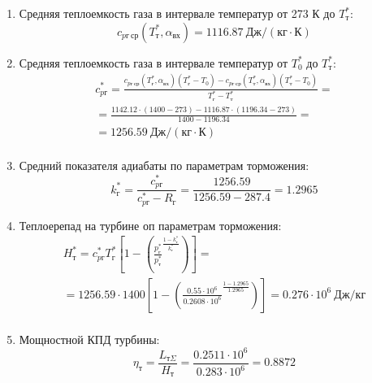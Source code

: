 \documentclass[a4paper,10pt]{article}
\begin{document}
\begin{enumerate}
        \item Средняя теплоемкость газа в интервале температур от 273 К до $T_т^*$:
        \[
            c_{pг\ ср} (T_т^*, \alpha_{вх}) =
            1116.87 \ Дж/(кг \cdot К)
        \]

        \item Средняя теплоемкость газа в интервале температур от $T_0^*$ до $T_т^*$:
        \begin{gather*}
            c_{pг}^* = \frac{
		         c_{pг\ ср} (T_г^*, \alpha_{вх}) (T_г^* - T_0) - c_{pг\ ср} (T_т^*, \alpha_{вх})(T_т^* - T_0)
		    }{
		        T_г^* - T_т^*} =\\
            =\frac{
                1142.12 \cdot
                (1400 - 273) -
		        1116.87 \cdot
                (1196.34 - 273)
		    }{
		        1400 - 1196.34} =\\
		     = 1256.59 \ Дж / (кг \cdot К)\\
        \end{gather*}

        \item Средний показателя адиабаты по параметрам торможения:
        \[
            k_г^* = \frac{ c_{pг}^* }{ c_{pг}^* - R_г } =
                \frac{
                    1256.59
                }{
                    1256.59 - 287.4
                }
            = 1.2965
        \]

        \item Теплоерепад на турбине оп параметрам торможения:
        \begin{gather*}
            H_т^* = c_{pг}^* T_г^* \left[
                        1 - \left(
                                \frac{p_г^*}{p_т^*} ^
                                \frac{1 - k_г^*}{k_г^*}
                    \right)
                \right] =\\
            =1256.59 \cdot 1400
                \left[
                    1 - \left(
                            \frac{
                                0.55 \cdot 10^6
                            }{
                                0.2608 \cdot 10^6 } ^
                            \frac{ 1 - 1.2965 }{ 1.2965 }
                    \right)
            \right] =
            0.276 \cdot 10^6 \ Дж/кг\\
        \end{gather*}

        \item Мощностной КПД турбины:
        \[
            \eta_т = \frac{ L_{т\Sigma} }{ H_т } =
                \frac{ 0.2511 \cdot 10^6 }{ 0.283 \cdot 10^6 } =
            0.8872
        \]


\end{enumerate}
\end{document}
